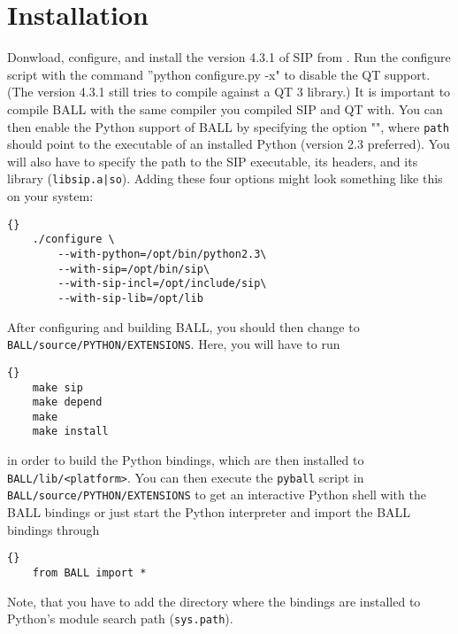 \section{Installation}

Donwload, configure, and install the version 4.3.1 of SIP from 
.
Run the configure script with the command ''python configure.py -x" to
disable the QT support. (The version 4.3.1 still tries to compile against a QT 3 library.)
It is important to compile BALL 
with the same \CPP compiler you compiled SIP and QT with. You can then enable the Python support of BALL
by specifying the option \mbox{""}, where
{\tt path} should point to the executable of an installed Python (version 2.3
preferred). You will also have to specify the path to the SIP executable, its
headers, and its library ({\tt libsip.a|so}). Adding these four options might
look something like this on your system:

\begin{lstlisting}{}
	./configure \
		--with-python=/opt/bin/python2.3\
		--with-sip=/opt/bin/sip\
		--with-sip-incl=/opt/include/sip\
		--with-sip-lib=/opt/lib
\end{lstlisting}

\noindent
After configuring and building BALL, you should then change to {\tt
BALL/source/PYTHON/EXTENSIONS}. Here, you will have to run

\begin{lstlisting}{}
	make sip
	make depend
	make
	make install
\end{lstlisting}

\noindent
in order to build the Python bindings, which are then installed to {\tt
BALL/lib/<platform>}. 
You can then execute the {\tt pyball} script in {\tt
BALL/source/PYTHON/EXTENSIONS} to get an interactive Python shell with the
BALL bindings or just start the Python interpreter and import the BALL
bindings through

\begin{lstlisting}{}
	from BALL import *
\end{lstlisting}

\noindent
Note, that you have to add the directory where the bindings are installed to
Python's module search path ({\tt sys.path}).
